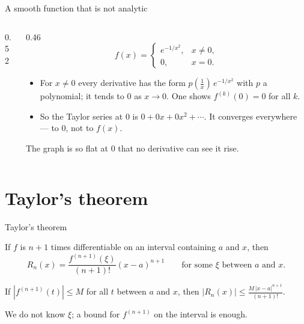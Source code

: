 \documentclass{wosm-slides}
\begin{document}
\begin{frame}{A smooth function that is not analytic}
\begin{columns}[c]
\begin{column}{0.52\textwidth}
    \end{column}
    \begin{column}{0.46\textwidth}
      \[ f(x) = \begin{cases} e^{-1/x^2}, & x \ne 0, \\ 0, & x = 0. \end{cases} \]
      \small
      \begin{itemize}
        \item For $x \ne 0$ every derivative has the form $p(\frac1x)\, e^{-1/x^2}$ with $p$ a
          polynomial; it tends to $0$ as $x \to 0$. One shows $f^{(k)}(0) = 0$ for all $k$.
        \item So the Taylor series at $0$ is $0 + 0x + 0x^2 + \cdots$. It converges
          everywhere --- to $0$, not to $f(x)$.
      \end{itemize}
      The graph is so flat at $0$ that no derivative can see it rise.
    \end{column}
  \end{columns}
\end{frame}

\section{Taylor's theorem}

\begin{frame}{Taylor's theorem}
  \begin{theorem}
    If $f$ is $n + 1$ times differentiable on an interval containing $a$ and $x$, then
    \[ R_n(x) = \frac{f^{(n+1)}(\xi)}{(n+1)!} (x - a)^{n+1} \qquad
       \text{for some } \xi \text{ between } a \text{ and } x . \]
  \end{theorem}
  \pause
  \begin{corollary}
    If $|f^{(n+1)}(t)| \le M$ for all $t$ between $a$ and $x$, then
    $|R_n(x)| \le \frac{M\, |x - a|^{n+1}}{(n+1)!}$.
  \end{corollary}
  We do not know $\xi$; a bound for $f^{(n+1)}$ on the interval is enough.
\end{frame}
\end{document}
